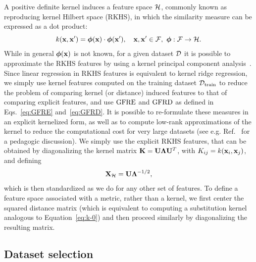 A positive definite kernel induces a feature space $\mathcal{H}$, commonly known as reproducing kernel Hilbert space (RKHS), in which the similarity measure can be expressed as a dot product:
\begin{equation}
    k(\mathbf{x},\mathbf{x}^{\prime}) = \boldsymbol{\phi}(\mathbf{x})\cdot\boldsymbol{\phi}(\mathbf{x}^{\prime}),\quad \mathbf{x},\mathbf{x}^{\prime}\in\mathcal{F},\,\, \boldsymbol{\phi}:\mathcal{F}\rightarrow\mathcal{H}.
\end{equation}
While in general $\boldsymbol{\phi}(\mathbf{x})$ is not known, for a given dataset $\mathcal{D}$ it is possible to approximate the RKHS features by using a kernel principal component analysis~\cite{scholkopf1997kernel}. Since linear regression in RKHS features is equivalent to kernel ridge regression, we simply use kernel features computed on the training  dataset $\mathcal{D}_{\mathrm{train}}$ to reduce the problem of comparing kernel (or distance) induced features to that of comparing explicit features, and use $\operatorname{GFRE}$ and $\operatorname{GFRD}$ as defined in Eqs.~\eqref{eq:GFRE} and~\eqref{eq:GFRD}. 
It is possible to re-formulate these measures in an explicit kernelized form, as well as to compute low-rank approximations of the kernel to reduce the computational cost for very large datasets (see e.g. Ref.~ for a pedagogic discussion). We simply use the explicit RKHS features, that can be obtained by diagonalizing the kernel matrix $\mathbf{K} = \mathbf{U} \boldsymbol{\Lambda} \mathbf{U}^T$, with $K_{ij} = k(\mathbf{x}_i, \mathbf{x}_j)$, and defining
\begin{equation}
\mathbf{X}_{\mathcal{H}} = \mathbf{U} \boldsymbol{\Lambda}^{-1/2},
\end{equation}
which is then standardized as we do for any other set of features. 
To define a feature space associated with a metric, rather than a kernel, we first center the squared distance matrix (which is equivalent to computing a substitution kernel analogous to Equation~\eqref{eq:k-0}) and then proceed similarly by diagonalizing the resulting matrix. 



\subsection{Dataset selection}

